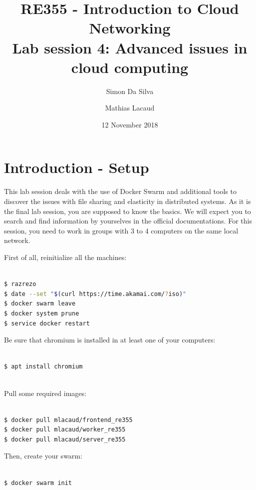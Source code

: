 \documentclass[a4paper,11pt]{exam}
\date{12 November 2018}
\title{RE355 - Introduction to Cloud Networking\\
Lab session 4: Advanced issues in cloud computing}
\author{Simon Da Silva \and Mathias Lacaud}
\begin{document}
\maketitle

\section{Introduction - Setup}

This lab session deals with the use of Docker Swarm and additional tools to discover the issues with file sharing and elasticity in distributed systems. 
As it is the final lab session, you are supposed to know the basics.
We will expect you to search and find information by yourselves in the official documentations.
For this session, you need to work in groups with 3 to 4 computers on the same local network.

First of all, reinitialize all the machines:

\begin{lstlisting}[frame=single,language={sh}]  % Start your code-block

$ razrezo
$ date --set "$(curl https://time.akamai.com/?iso)"
$ docker swarm leave
$ docker system prune
$ service docker restart 

\end{lstlisting}

Be sure that chromium is installed in at least one of your computers: 

\begin{lstlisting}[frame=single,language={sh}]  % Start your code-block

$ apt install chromium
	
\end{lstlisting}

Pull some required images:

\begin{lstlisting}[frame=single,language={sh}]  % Start your code-block

$ docker pull mlacaud/frontend_re355 
$ docker pull mlacaud/worker_re355 
$ docker pull mlacaud/server_re355

\end{lstlisting}

Then, create your swarm: 

\begin{lstlisting}[frame=single,language={sh}]  % Start your code-block

$ docker swarm init

\end{lstlisting}
\end{document}
